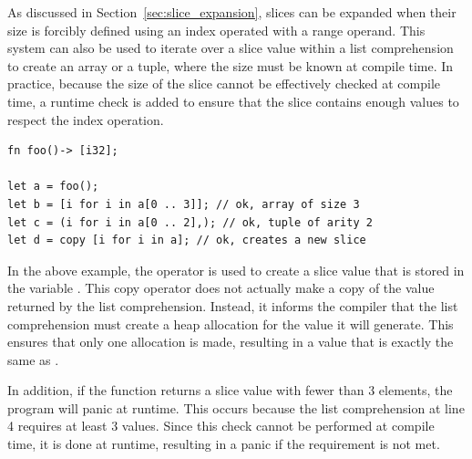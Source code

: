 As discussed in Section~\ref{sec:slice_expansion}, slices can be expanded when
their size is forcibly defined using an index operated with a range operand.
This system can also be used to iterate over a slice value within a list
comprehension to create an array or a tuple, where the size must be known at
compile time. In practice, because the size of the slice cannot be effectively
checked at compile time, a runtime check is added to ensure that the slice
contains enough values to respect the index operation.

\begin{lstlisting}[style=coloredverbatim, label=lst:(chap7):list_compr_slice_to_array, caption=List comprehension over a slice with cte size]
fn foo()-> [i32];

let a = foo();
let b = [i for i in a[0 .. 3]]; // ok, array of size 3
let c = (i for i in a[0 .. 2],); // ok, tuple of arity 2
let d = copy [i for i in a]; // ok, creates a new slice
\end{lstlisting}

In the above example, the  operator is used to create a slice value
that is stored in the variable . This copy operator does not actually
make a copy of the value returned by the list comprehension. Instead, it informs
the compiler that the list comprehension must create a heap allocation for the
value it will generate. This ensures that only one allocation is made, resulting
in a value that is exactly the same as .

In addition, if the function  returns a slice value with fewer than 3
elements, the program will panic at runtime. This occurs because the list
comprehension at line 4 requires at least 3 values. Since this check cannot be
performed at compile time, it is done at runtime, resulting in a panic if the
requirement is not met.

\vfill%
\pagebreak
